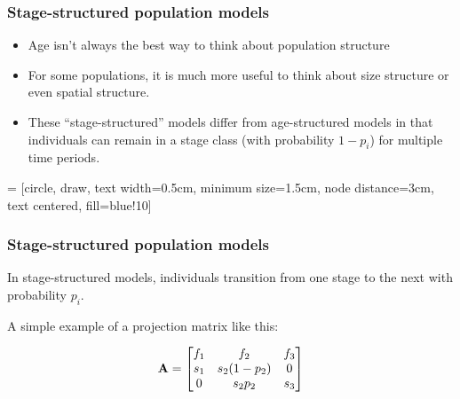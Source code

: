 \documentclass[color=usenames,dvipsnames]{beamer}\usepackage[]{graphicx}\usepackage[]{color}
\begin{document}
\begin{frame}
  \frametitle{Stage-structured population models}
  \begin{itemize}
    \item Age isn't always the best way to think about population structure
    \item<2-> For some populations, it is much more useful to think about size
      structure or even spatial structure.
    \item<3->  These ``stage-structured'' models differ from age-structured models
      in that individuals can remain in a stage class (with
      probability $1-p_i$) for multiple time periods.
  \end{itemize}
   = [circle, draw, text width=0.5cm, minimum size=1.5cm,
  node distance=3cm, text centered, fill=blue!10]
  \begin{center}
  \end{center}
\end{frame}






\begin{frame}
  \frametitle{Stage-structured population models}
  \large
  In stage-structured models, individuals transition from one
  stage to the next with probability $p_i$. \par
  \vfill
  \pause
  A simple example of a projection matrix like this:
  \pause
  \vfill
  \begin{center}
    \[
    {\bf A} =
    \begin{bmatrix}
      f_1 & f_2        & f_3 \\
      s_1 & s_2(1-p_2) & 0   \\
      0   & s_2 p_2    & s_3 \\
    \end{bmatrix}
    \]
  \end{center}
\end{frame}
\end{document}
